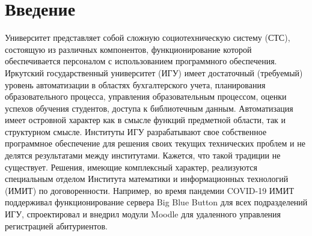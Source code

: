 \documentclass[ 

]{aiitart}
\begin{document}
\maketitle

\section{Введение} 

Университет представляет собой сложную социотехническую систему (СТС), \cite{zh2020} состоящую из различных компонентов, функционирование которой обеспечивается персоналом с использованием программного обеспечения. Иркутский государственный университет (ИГУ) имеет достаточный (требуемый) уровень автоматизации в областях бухгалтерского учета, планирования образовательного процесса, управления образовательным процессом, оценки успехов обучения студентов, доступа к библиотечным данным. Автоматизация имеет островной характер как в смысле функций предметной области, так и структурном смысле. Институты ИГУ разрабатывают свое собственное программное обеспечение для решения своих текущих технических проблем и не делятся результатами между институтами. Кажется, что такой традиции не существует. Решения, имеющие комплексный характер, реализуются специальным отделом Института математики и информационных технологий (ИМИТ) по договоренности. Например, во время пандемии COVID-19 ИМИТ поддерживал функционирование сервера Big Blue Button для всех подразделений ИГУ, спроектировал и внедрил модули Moodle для удаленного управления регистрацией абитуриентов. 
\end{document}
